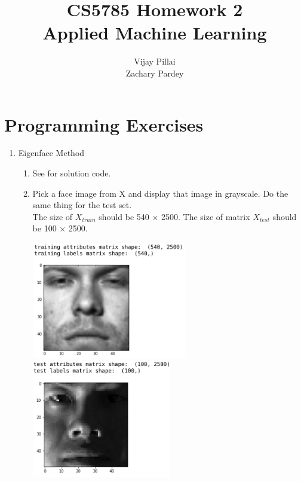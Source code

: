 \documentclass{report}
\begin{document}
\title{CS5785 Homework 2\\
\large{
    Applied Machine Learning
}
}


\author{
	Vijay Pillai\\
	Zachary Pardey}
\maketitle
\section*{Programming Exercises}

\begin{enumerate}
	\item Eigenface Method
	\begin{enumerate}[label=(\alph*)]
		\item See  for solution code.
		\item Pick a face image from X and display that image in grayscale. Do the same thing for the test set. \\
		The size of $X_{train}$ should be 540 × 2500.
		The size of matrix $X_{test}$ should be 100 × 2500.
		\begin{center}
		\includegraphics[width=6.75cm]{images/train_face.png}
		\includegraphics[width=6.1cm]{images/test_face.png}
		\end{center}

\end{enumerate}
\end{enumerate}
\end{document}
